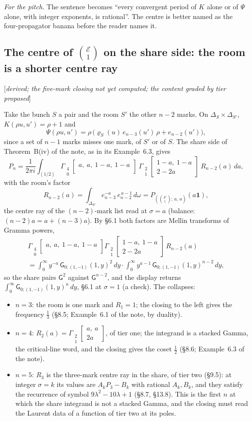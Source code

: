 \documentclass[11pt]{article}
\newcommand{\cE}{\mathcal E}
\newcommand{\one}{\mathbf 1}
\newcommand{\sG}{\mathsf G}
\newcommand{\Gst}[4]{\Gamma_{\substack{#1\\#2}}\!\begin{bmatrix}#3\\#4\end{bmatrix}}
\newcommand{\status}[1]{\hfill{\small[\textit{#1}]}}
\theoremstyle{plain}
\theoremstyle{remark}
\begin{document}
\emph{For the pitch.} The sentence becomes ``every convergent period of $K$ alone or of $\Psi$ alone, with integer exponents, is rational''. The centre is better named as the four-propagator banana before the reader names it.

\subsection{The centre of $\binom{\cE}1$ on the share side: the room is a shorter centre ray}\status{derived; the five-mark closing not yet computed; the content graded by tier proposed}

Take the bunch $S$ a pair and the room $S'$ the other $n-2$ marks. On $\Delta_S\times\Delta_{S'}$, $K(\rho u,u')=\rho+1$ and
\[
\Psi(\rho u,u')=\rho\,\big(\varrho_S(u)\,e_{n-3}(u')\,\rho+e_{n-2}(u')\big),
\]
since a set of $n-1$ marks misses one mark, of $S'$ or of $S$. The share side of Theorem~B(iv) of the note, as in its Example~6.3, gives
\[
P_n=\frac1{2\pi i}\int_{(1/2)}\Gst40{a,\ a,\ 1-a,\ 1-a}{}\ \Gst21{1-a,\ 1-a}{2-2a}\ R_{n-2}(a)\,da,
\]
with the room's factor
\[
R_{n-2}(a)=\int_{\Delta_{S'}}e_{n-3}^{-a}\,e_{n-2}^{\,a-1}\,d\omega=P_{(\binom{S'}1;\,a,\,a)}(a\one),
\]
the centre ray of the $(n-2)$-mark list read at $\sigma=a$ (balance: $(n-2)a=a+(n-3)a$). By \S6.1 both factors are Mellin transforms of Gramma powers,
\begin{multline*}
\Gst40{a,\ a,\ 1-a,\ 1-a}{}\Gst21{1-a,\ 1-a}{2-2a}\,R_{n-2}(a)\\
=\int_0^\infty y^{-a}\,\sG_{0;(1,-1)}(1,y)^2\,dy\cdot\int_0^\infty y^{a-1}\,\sG_{0;(1,-1)}(1,y)^{n-2}\,dy,
\end{multline*}
so the share pairs $\sG^2$ against $\sG^{n-2}$, and the display returns $\int_0^\infty\sG_{0;(1,-1)}(1,y)^n\,dy$, \S6.1 at $\sigma=1$ (a check). The collapses:
\begin{itemize}
\item $n=3$: the room is one mark and $R_1=1$; the closing to the left gives the frequency $\frac13$ (\S8.5; Example~6.1 of the note, by duality).
\item $n=4$: $R_2(a)=\Gst21{a,\ a}{2a}$, of tier one; the integrand is a stacked Gamma, the critical-line word, and the closing gives the coset $\frac12$ (\S8.6; Example~6.3 of the note).
\item $n=5$: $R_3$ is the three-mark centre ray in the share, of tier two (\S9.5): at integer $\sigma=k$ its values are $A_kP_3-B_k$ with rational $A_k,B_k$, and they satisfy the recurrence of symbol $9\lambda^2-10\lambda+1$ (\S8.7, \S13.8). This is the first $n$ at which the share integrand is not a stacked Gamma, and the closing must read the Laurent data of a function of tier two at its poles.
\end{itemize}
\end{document}
